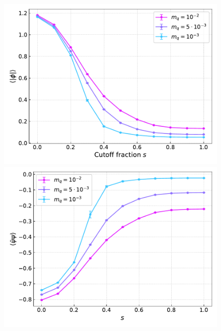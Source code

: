 \begin{figure}[h]
\centering
\begin{minipage}{0.45\textwidth}	
	\includegraphics[scale=0.48]{figures/chiral_PT/magnetisation.pdf}
\end{minipage}
\hfill
\begin{minipage}{0.45\textwidth}	
	\includegraphics[scale=0.48]{figures/chiral_PT/condensate.pdf}
\end{minipage}
\begin{minipage}{0.45\textwidth}	

\end{minipage}
\end{figure}
